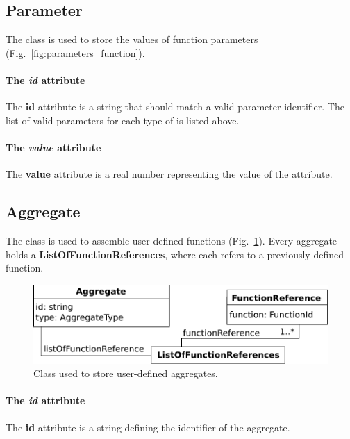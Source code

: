 \subsection{Parameter}
\label{sec:parameter}

The \parameter{} class is used to store the values of function parameters
(Fig.~\ref{fig:parameters_function}).

\paragraph{The \textit{id} attribute}
The \textbf{id} attribute is a string that should match a valid parameter
identifier.
The list of valid parameters for each type of \function{} is listed above.

\paragraph{The \textit{value} attribute}
The \textbf{value} attribute is a real number representing
the value of the attribute.


\subsection{Aggregate}
\label{sec:aggregate}

The \aggregate{} class is used to assemble user-defined functions
(Fig.~\ref{fig:parameters_aggregate}).
Every aggregate holds a \textbf{ListOfFunctionReferences},
where each \functionreference{} refers to a previously defined function.

\begin{figure}
  \centering
  \includegraphics[scale=0.8]{figures/parameters_aggregate}
  \caption{Class used to store user-defined aggregates.}
\label{fig:parameters_aggregate}
\end{figure}

\paragraph{The \textit{id} attribute}
The \textbf{id} attribute is a string defining the identifier of the aggregate.

